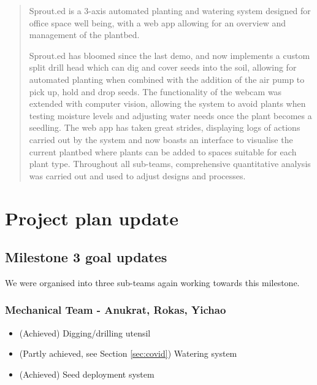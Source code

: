 \documentclass{article}
\begin{document}
 



\begin{abstract}
Sprout.ed is a 3-axis automated planting and watering system designed for office space well being, with a web app allowing for an overview and management of the plantbed. 

Sprout.ed has bloomed since the last demo, and now implements a custom split drill head which can dig and cover seeds into the soil, allowing for automated planting when combined with the addition of the air pump to pick up, hold and drop seeds. The functionality of the webcam was extended with computer vision, allowing the system to avoid plants when testing moisture levels and adjusting water needs once the plant becomes a seedling. The web app has taken great strides, displaying logs of actions carried out by the system and now boasts an interface to visualise the current plantbed where plants can be added to spaces suitable for each plant type. Throughout all sub-teams, comprehensive quantitative analysis was carried out and used to adjust designs and processes.
\end{abstract} 

\section{Project plan update} 

\subsection{Milestone 3 goal updates}
We were organised into three sub-teams again working towards this milestone.
\subsubsection{\textbf{Mechanical Team - Anukrat, Rokas, Yichao}}

\vspace{1mm}
\begin{itemize}
    \setlength\itemsep{0.01em}
    \setlength\parskip{0pt}
    \item (Achieved) Digging/drilling utensil
    \item (Partly achieved, see Section \ref{sec:covid}) Watering system
    \item (Achieved) Seed deployment system
\end{itemize}
\end{document}
